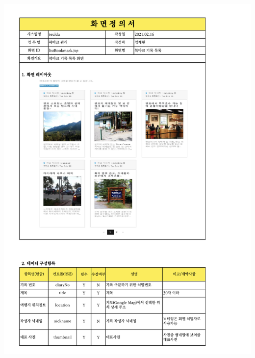 {{{{{{{{{{{{{{{{{{{{{{{{{{{{{{{{{{{{{{{{{{{{{{{{{{{{{{{{{{{{{{{{{{{{\includegraphics[width=19cm]{./Figure/Design/Display/post/post_16.pdf} \\
}}}}}}}}}}}}}}}}}}}}}}}}}}}}}}}}}}}}}}}}}}}}}}}}}}}}}}}}}}}}}}}}}}}}
